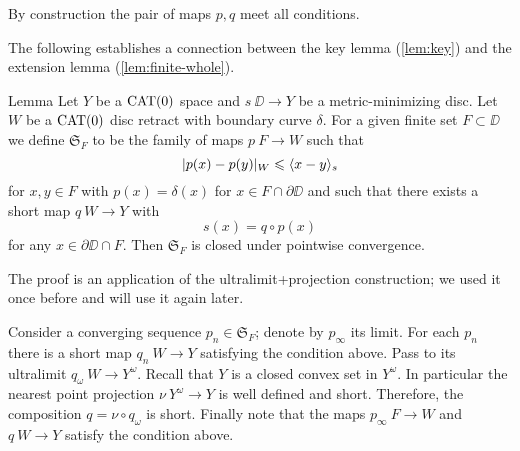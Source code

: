 By construction the pair of maps $p,q$ meet all conditions.
\qeds

The following establishes a connection between the 
key lemma (\ref{lem:key}) and the extension lemma (\ref{lem:finite-whole}).

\begin{thm}{Lemma}\label{lem:S-closed}
Let $Y$ be a $\mathop{\rm CAT}\nolimits(0)$ space and $s\:\DD\to Y$ 
be a metric-minimizing disc. Let $W$ be a
$\mathop{\rm CAT}\nolimits(0)$ disc retract with boundary curve $\delta$. For a given 
finite set $F\subset \DD$ we define $\mathfrak{S}_F$ to be the family of maps  
 $p\:F\to W$ such that
\[|p(x)-p(y)|_W\leqslant \langle x-y\rangle_s\] 
for $x,y\in F$ with $p(x)=\delta(x)$ for $x\in F\cap \partial\DD$ and such that there exists
a short map $q\:W\to Y$ with
\[s(x)=q\circ p(x)\] 
for any $x\in\partial\DD\cap F$.
Then $\mathfrak{S}_F$ is closed under pointwise convergence. 
\end{thm}

The proof is an application of the ultralimit+projection construction;
we used it once before and will use it again later.

Consider a converging sequence $p_n\in  \mathfrak{S}_F$;
denote by $p_\infty$ its limit.
For each $p_n$ there is a short map $q_n\:W\to Y$ satisfying the condition above.
Pass to its ultralimit $q_\omega\:W\to Y^\omega$.
Recall that $Y$ is a closed convex set in $Y^\omega$.
In particular the nearest point projection $\nu\:Y^\omega\to Y$ is well defined and short.
Therefore, the composition $q=\nu\circ q_\omega$ is short.
Finally note that the maps $p_\infty\:F\to W$ and $q\:W\to Y$ satisfy the condition above.
\qeds

